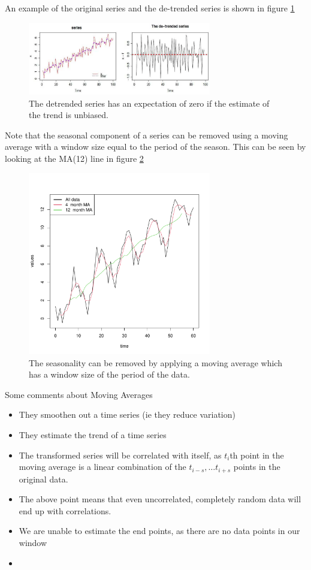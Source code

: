 \documentclass[12pt]{article}
\begin{document}
    An example of the original series and the de-trended series is shown in figure
    \ref{fig:detrended_series}

    \begin{figure}[t]
        \centering
        \includegraphics[width=8cm]{detrended_series}
        \caption{The detrended series has an expectation of zero if the estimate of
        the trend is unbiased.}
        \label{fig:detrended_series}
    \end{figure}

    Note that the seasonal component of a series can be removed using a moving
    average with a window size equal to the period of the season. This can be 
    seen by looking at the MA(12) line in figure \ref{fig:removing_the_seasons}


    \begin{figure}[t]
        \centering
        \includegraphics[width=8cm]{removing_the_seasons}
        \caption{The seasonality can be removed by applying a moving average
        which has a window size of the period of the data.}
        \label{fig:removing_the_seasons}
    \end{figure}


    Some comments about Moving Averages
    \begin{itemize} 
        \item They smoothen out a time series (ie they reduce variation)
        \item They estimate the trend of a time series
        \item The transformed series will be correlated with itself, as $t_i$th
            point in the moving average is a linear combination of the 
            $t_{i-s}, \dots t_{i+s}$ points in the original data.
        \item The above point means that even uncorrelated, completely random data
            will end up with correlations.
        \item We are unable to estimate the end points, as there are no data points
            in our window
        \item 
    \end{itemize} 
\end{document}
